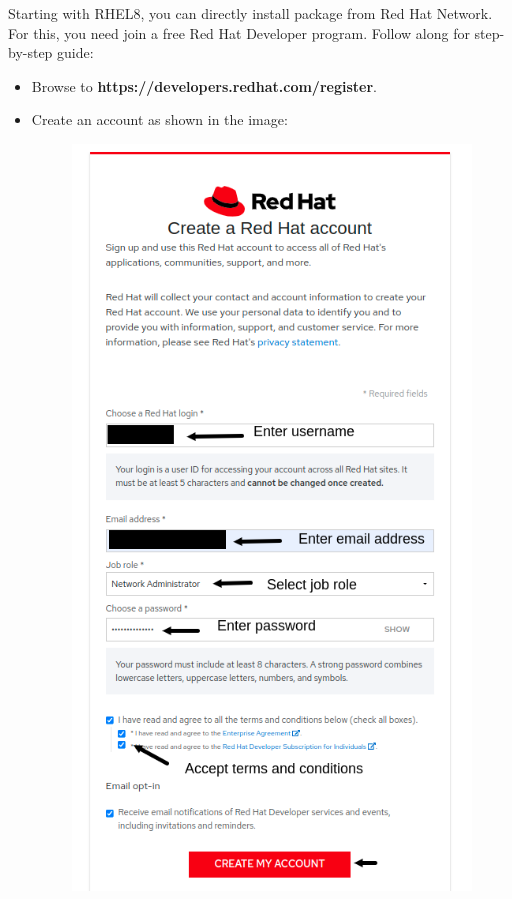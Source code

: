 \setlength{\columnsep}{3pt}
\begin{flushleft}

Starting with RHEL8, you can directly install package from Red Hat Network. 
\newline
For this, you need join a free Red Hat Developer program. 
\newline
Follow along for step-by-step guide:

\begin{itemize}
			\item Browse to \textbf{https://developers.redhat.com/register}.
			\item Create an account as shown in the image:
			\begin{figure}[h!]
				\centering
				\includegraphics[scale=.4]{content/chapter11/images/account.png}

\end{figure}
\end{itemize}
\end{flushleft}
